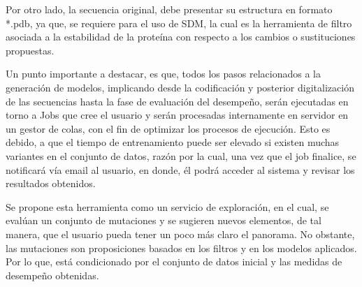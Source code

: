 Por otro lado, la secuencia original, debe presentar su estructura en formato *.pdb, ya que, se requiere para el uso de SDM, la cual es la herramienta de filtro asociada a la estabilidad de la proteína con respecto a los cambios o sustituciones propuestas.

Un punto importante a destacar, es que, todos los pasos relacionados a la generación de modelos, implicando desde la codificación y posterior digitalización de las secuencias hasta la fase de evaluación del desempeño, serán ejecutadas en torno a Jobs que cree el usuario y serán procesadas internamente en servidor en un gestor de colas, con el fin de optimizar los procesos de ejecución. Esto es debido, a que el tiempo de entrenamiento puede ser elevado si existen muchas variantes en el conjunto de datos, razón por la cual, una vez que el job finalice, se notificará vía email al usuario, en donde, él podrá acceder al sistema y revisar los resultados obtenidos.

Se propone esta herramienta como un servicio de exploración, en el cual, se evalúan un conjunto de mutaciones y se sugieren nuevos elementos, de tal manera, que el usuario pueda tener un poco más claro el panorama. No obstante, las mutaciones son proposiciones basados en los filtros y en los modelos aplicados. Por lo que, está condicionado por el conjunto de datos inicial y las medidas de desempeño obtenidas. 
